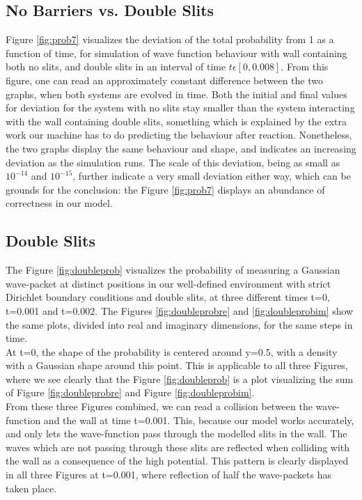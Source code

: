\documentclass[10pt, nofootinbib, twocolumn]{revtex4-1}
\begin{document}
\subsection{No Barriers vs. Double Slits}
Figure \ref{fig:prob7} visualizes the deviation of the total probability from 1 as a function of time, for simulation of wave function behaviour with wall containing both no slits, and double slits in an interval of time $t\epsilon [0,0.008]$. From this figure, one can read an approximately constant difference between the two graphs, when both systems are evolved in time. Both the initial and final values for deviation for the system with no slits stay smaller than the system interacting with the wall containing double slits, something which  is explained by the extra work our machine has to do predicting the behaviour after reaction. Nonetheless, the two graphs display the same behaviour and shape, and indicates an increasing deviation as the simulation runs. The scale of this deviation, being as small as $10^{-14}$ and $10^{-15}$, further indicate a very small deviation either way, which can be grounds for the conclusion: the Figure \ref{fig:prob7} displays an abundance of correctness in our model. 



\subsection{Double Slits}
The Figure \ref{fig:doubleprob} visualizes the probability of measuring a Gaussian wave-packet at distinct positions in our well-defined environment with strict Dirichlet boundary conditions and double slits, at three different times t=0, t=0.001 and t=0.002. The Figures \ref{fig:doubleprobre} and \ref{fig:doubleprobim} show the same plots, divided into real and imaginary dimensions, for the same steps in time. \\

At t=0, the shape of the probability is centered around y=0.5, with a density with a Gaussian shape around this point. This is applicable to all three Figures, where we see clearly that the Figure \ref{fig:doubleprob} is a plot visualizing the sum of Figure \ref{fig:doubleprobre} and Figure \ref{fig:doubleprobim}. \\

From these three Figures combined, we can read a collision between the wave-function and the wall at time t=0.001. This, because our model works accurately, and only lets the wave-function pass through the modelled slits in the wall. The waves which are not passing through these slits are reflected when colliding with the wall as a consequence of the high potential. This pattern is clearly displayed in all three Figures at t=0.001, where reflection of half the wave-packets has taken place. \\
\end{document}

